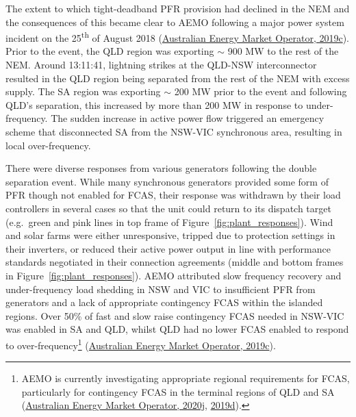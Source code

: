 \documentclass[12pt,a4paper,]{report}
\begin{document}
The extent to which tight-deadband PFR provision had declined in the NEM
and the consequences of this became clear to AEMO following a major
power system incident on the 25\textsuperscript{th} of August 2018
(\protect\hyperlink{ref-australianenergymarketoperatorFinalReportQueensland2019}{Australian
Energy Market Operator, 2019c}). Prior to the event, the QLD region was
exporting \(\sim\) 900 MW to the rest of the NEM. Around 13:11:41,
lightning strikes at the QLD-NSW interconnector resulted in the QLD
region being separated from the rest of the NEM with excess supply. The
SA region was exporting \(\sim\) 200 MW prior to the event and following
QLD's separation, this increased by more than 200 MW in response to
under-frequency. The sudden increase in active power flow triggered an
emergency scheme that disconnected SA from the NSW-VIC synchronous area,
resulting in local over-frequency.

There were diverse responses from various generators following the
double separation event. While many synchronous generators provided some
form of PFR though not enabled for FCAS, their response was withdrawn by
their load controllers in several cases so that the unit could return to
its dispatch target (e.g.~green and pink lines in top frame of
Figure~\ref{fig:plant_responses}). Wind and solar farms were either
unresponsive, tripped due to protection settings in their inverters, or
reduced their active power output in line with performance standards
negotiated in their connection agreements (middle and bottom frames in
Figure~\ref{fig:plant_responses}). AEMO attributed slow frequency
recovery and under-frequency load shedding in NSW and VIC to
insufficient PFR from generators and a lack of appropriate contingency
FCAS within the islanded regions. Over 50\% of fast and slow raise
contingency FCAS needed in NSW-VIC was enabled in SA and QLD, whilst QLD
had no lower FCAS enabled to respond to over-frequency\footnote{AEMO is
  currently investigating appropriate regional requirements for FCAS,
  particularly for contingency FCAS in the terminal regions of QLD and
  SA
  (\protect\hyperlink{ref-australianenergymarketoperatorRenewableIntegrationStudy2020b}{Australian
  Energy Market Operator, 2020j},
  \protect\hyperlink{ref-australianenergymarketoperatorElectricityRuleChange2019a}{2019d}).}
(\protect\hyperlink{ref-australianenergymarketoperatorFinalReportQueensland2019}{Australian
Energy Market Operator, 2019c}).
\end{document}
